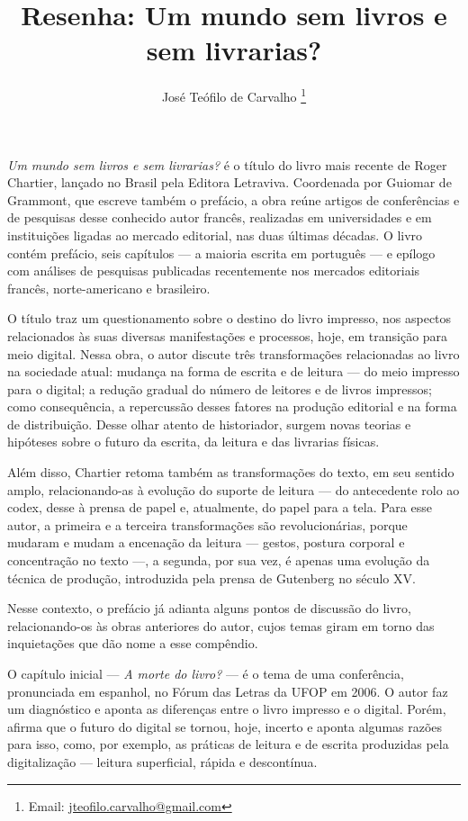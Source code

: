 \documentclass[portuguese]{textolivre}
\title{Resenha: Um mundo sem livros e sem livrarias?}
\author[1]{José Teófilo de Carvalho \orcid{0000-0003-4201-6214} \thanks{Email: \url{jteofilo.carvalho@gmail.com}}}
\begin{document}
\maketitle

\begin{quote}
\end{quote}


\emph{Um mundo sem livros e sem livrarias?} é o título do livro mais recente de Roger Chartier, lançado no Brasil pela Editora Letraviva. Coordenada por Guiomar de Grammont, que escreve também o prefácio, a obra reúne artigos de conferências e de pesquisas desse conhecido autor francês, realizadas em universidades e em instituições ligadas ao mercado editorial, nas duas últimas décadas. O livro contém prefácio, seis capítulos — a maioria escrita em português — e epílogo com análises de pesquisas publicadas recentemente nos mercados editoriais francês, norte-americano e brasileiro.

O título traz um questionamento sobre o destino do livro impresso, nos aspectos relacionados às suas diversas manifestações e processos, hoje, em transição para meio digital. Nessa obra, o autor discute três transformações relacionadas ao livro na sociedade atual: mudança na forma de escrita e de leitura — do meio impresso para o digital; a redução gradual do número de leitores e de livros impressos; como consequência, a repercussão desses fatores na produção editorial e na forma de distribuição. Desse olhar atento de historiador, surgem novas teorias e hipóteses sobre o futuro da escrita, da leitura e das livrarias físicas.

Além disso, Chartier retoma também as transformações do texto, em seu sentido amplo, relacionando-as à evolução do suporte de leitura — do antecedente rolo ao codex, desse à prensa de papel e, atualmente, do papel para a tela. Para esse autor, a primeira e a terceira transformações são revolucionárias, porque mudaram e mudam a encenação da leitura — gestos, postura corporal e concentração no texto —, a segunda, por sua vez, é apenas uma evolução da técnica de produção, introduzida pela prensa de Gutenberg no século XV.

Nesse contexto, o prefácio já adianta alguns pontos de discussão do livro, relacionando-os às obras anteriores do autor, cujos temas giram em torno das inquietações que dão nome a esse compêndio.

O capítulo inicial — \emph{A morte do livro?} — é o tema de uma conferência, pronunciada em espanhol, no Fórum das Letras da UFOP em 2006. O autor faz um diagnóstico e aponta as diferenças entre o livro impresso e o digital. Porém, afirma que o futuro do digital se tornou, hoje, incerto e aponta algumas razões para isso, como, por exemplo, as práticas de leitura e de escrita produzidas pela digitalização — leitura superficial, rápida e descontínua.
\end{document}
